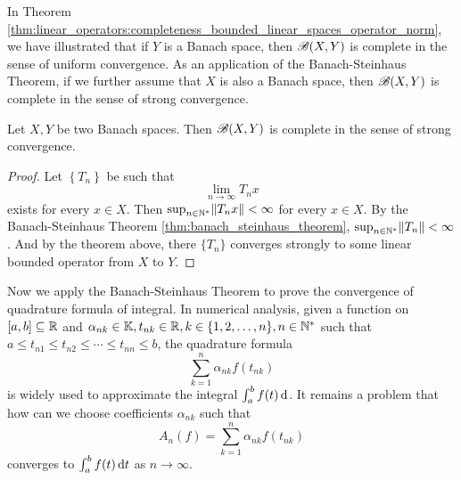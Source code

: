 In Theorem 
\ref{thm:linear_operators:completeness_bounded_linear_spaces_operator_norm}, 
we have illustrated that if $Y$ is a Banach space, then $\mathscr{B}(X, Y)$ is 
complete in the sense of uniform convergence. 
As an application of the Banach-Steinhaus Theorem, if we further assume that 
$X$ is also a Banach space, then $\mathscr{B}(X, Y)$ is complete in the sense of 
strong convergence. 
\begin{thm}
Let $X, Y$ be two Banach spaces. 
Then $\mathscr{B}(X, Y)$ is complete in the sense of strong convergence. 
\end{thm}
\begin{proof}
Let $\left\{ T_n \right\}$ be such that 
\begin{equation*}
    \lim_{n \to \infty} T_n x
\end{equation*}
exists for every $x \in X$. 
Then $\sup_{n \in \mathbb{N}^\ast} \norm{T_n x} < \infty$ for every $x \in X$. 
By the Banach-Steinhaus Theorem \ref{thm:banach_steinhaus_theorem}, 
$\sup_{n \in \mathbb{N}^\ast} \norm{T_n} < \infty$. 
And by the theorem above, there $\{T_n\}$ converges strongly to some linear 
bounded operator from $X$ to $Y$. 
\end{proof}

Now we apply the Banach-Steinhaus Theorem to prove the convergence of 
quadrature formula of integral. 
In numerical analysis, given a function on $[a, b] \subseteq \mathbb{R}$ and 
$\alpha_{nk} \in \mathbb{K}, t_{nk} \in \mathbb{R}, k \in \{ 1, 2, \ldots, n \}, 
n \in \mathbb{N}^\ast$ such that $a \le t_{n1} \le t_{n2} \le \cdots \le t_{nn} \le b$, 
the quadrature formula 
\begin{equation*}
    \sum_{k=1}^{n} \alpha_{nk} f(t_{nk}) 
\end{equation*}
is widely used to approximate the integral $\int_{a}^{b} f(t) \mathop{}\!\mathrm{d}$. 
It remains a problem that how can we choose coefficients $\alpha_{nk}$ 
such that 
\begin{equation*}
    A_n(f) = \sum_{k=1}^{n} \alpha_{nk} f(t_{nk}) 
\end{equation*}
converges to $\int_{a}^{b} f(t) \mathop{}\!\mathrm{d} t$ as $n \to \infty$. 

